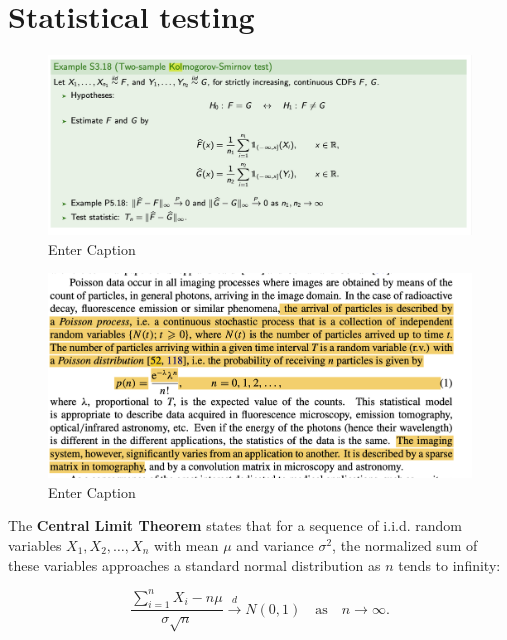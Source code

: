 \section{Statistical testing}

\begin{figure}[t]
    \centering
    \includegraphics[width=1\linewidth]{images/2024-08-27-15.11.15.png}
    \caption{Enter Caption}
\end{figure}




\begin{figure}
    \centering
    \includegraphics[width=1\linewidth]{images/JD-54-image.png}
    \caption{Enter Caption}
    \label{fig:enterl}
\end{figure}

The \textbf{Central Limit Theorem} states that for a sequence of i.i.d. random variables \(X_1, X_2, \ldots, X_n\) with mean \( \mu \) and variance \( \sigma^2 \), the normalized sum of these variables approaches a standard normal distribution as \(n\) tends to infinity:

\[
\frac{\sum_{i=1}^{n} X_i - n\mu}{\sigma \sqrt{n}} \xrightarrow{d} N(0, 1) \quad \text{as} \quad n \to \infty.
\]

